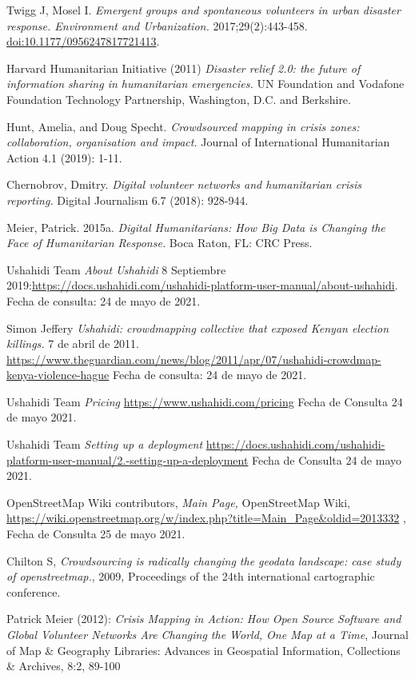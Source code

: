 \documentclass[12pt,spanish,oneside,breaklinks]{book}
\begin{document}
\begin{thebibliography}{1}
 Twigg J, Mosel I. {\em Emergent groups and spontaneous volunteers in urban disaster response. Environment and Urbanization.}  2017;29(2):443-458. \url{doi:10.1177/0956247817721413}.

 Harvard Humanitarian Initiative (2011) {\em Disaster relief 2.0: the future of information sharing in humanitarian emergencies.} UN Foundation and Vodafone Foundation Technology Partnership, Washington, D.C. and Berkshire.

 Hunt, Amelia, and Doug Specht. {\em Crowdsourced mapping in crisis zones: collaboration, organisation and impact.} Journal of International Humanitarian Action 4.1 (2019): 1-11.

 Chernobrov, Dmitry. {\em Digital volunteer networks and humanitarian crisis reporting.} Digital Journalism 6.7 (2018): 928-944.

 Meier, Patrick. 2015a. {\em Digital Humanitarians: How Big Data is Changing the Face of Humanitarian Response.} Boca Raton, FL: CRC Press.

 Ushahidi Team {\em About Ushahidi} 8 Septiembre 2019:\url{https://docs.ushahidi.com/ushahidi-platform-user-manual/about-ushahidi}. Fecha de consulta: 24 de mayo de 2021.

 Simon Jeffery {\em Ushahidi: crowdmapping collective that exposed Kenyan election killings.} 7 de abril de 2011. \url{https://www.theguardian.com/news/blog/2011/apr/07/ushahidi-crowdmap-kenya-violence-hague} Fecha de consulta: 24 de mayo de 2021.

 Ushahidi Team {\em Pricing} \url{https://www.ushahidi.com/pricing} Fecha de Consulta 24 de mayo 2021.

 Ushahidi Team {\em Setting up a deployment} \url{https://docs.ushahidi.com/ushahidi-platform-user-manual/2.-setting-up-a-deployment} Fecha de Consulta 24 de mayo 2021.

 OpenStreetMap Wiki contributors, {\em Main Page,} OpenStreetMap Wiki, \url{https://wiki.openstreetmap.org/w/index.php?title=Main_Page&oldid=2013332} , Fecha de Consulta 25 de mayo 2021.

 Chilton S, {\em Crowdsourcing is radically changing the geodata landscape: case study of openstreetmap.}, 2009, Proceedings of the 24th international cartographic conference.

   Patrick Meier (2012): {\em Crisis Mapping in Action: How Open Source Software and Global Volunteer Networks Are Changing the World, One Map at a Time}, Journal of Map \& Geography Libraries: Advances in Geospatial Information, Collections \& Archives, 8:2, 89-100


\end{thebibliography}
\end{document}
